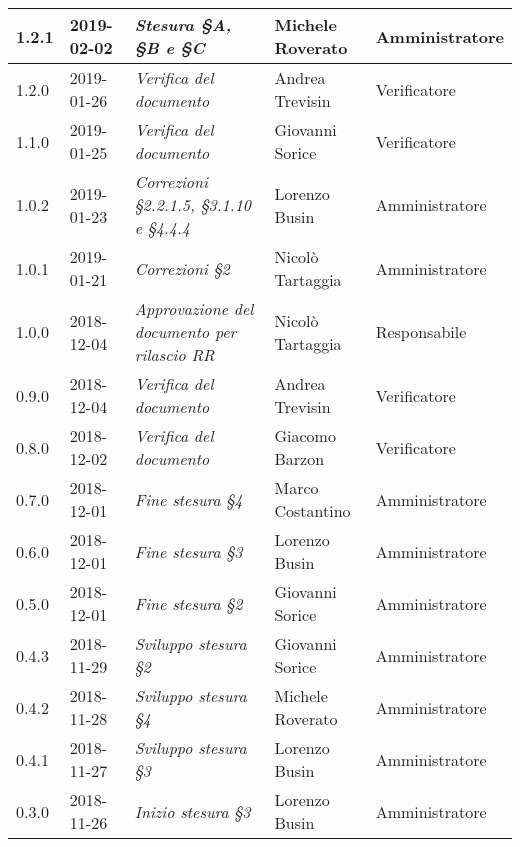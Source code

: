 \begin{longtable}{C{2cm}|C{2.5cm}|C{4.5cm}|C{2.5cm}|C{3cm}}
		1.2.1 & 2019-02-02 & \emph{Stesura §A, §B e §C} & Michele Roverato & Amministratore  \\
		\hline
		
		1.2.0 & 2019-01-26 & \emph{Verifica del documento} & Andrea Trevisin & Verificatore  \\
		\hline
		
		1.1.0 & 2019-01-25 & \emph{Verifica del documento} & Giovanni Sorice & Verificatore  \\
		\hline
		
		1.0.2 & 2019-01-23 & \emph{Correzioni §2.2.1.5, §3.1.10 e §4.4.4} & Lorenzo Busin & Amministratore \\
		\hline
		
		1.0.1 & 2019-01-21 & \emph{Correzioni §2} & Nicolò Tartaggia & Amministratore  \\
		\hline
		
		1.0.0  & 2018-12-04 & \emph{Approvazione del documento per rilascio RR} & Nicolò Tartaggia & Responsabile \\
		\hline
		
		0.9.0 & 2018-12-04 &\emph{Verifica del documento} & Andrea Trevisin & Verificatore \\
		\hline
		
	    0.8.0 & 2018-12-02 & \emph{Verifica del documento} & Giacomo Barzon & Verificatore  \\
		\hline
		
		0.7.0 & 2018-12-01 & \emph{Fine stesura §4} & Marco Costantino & Amministratore  \\
		\hline
		
		0.6.0 & 2018-12-01 & \emph{Fine stesura §3} & Lorenzo Busin & Amministratore  \\
		\hline
		
	 	0.5.0 & 2018-12-01 & \emph{Fine stesura §2} & Giovanni Sorice & Amministratore  \\
		\hline
		
		0.4.3 & 2018-11-29 & \emph{Sviluppo stesura §2} & Giovanni Sorice & Amministratore  \\
		\hline
		
		0.4.2 & 2018-11-28 & \emph{Sviluppo stesura §4} & Michele Roverato & Amministratore  \\
		\hline
		
		 0.4.1 & 2018-11-27 &\emph{Sviluppo stesura §3} & Lorenzo Busin & Amministratore \\
		\hline
		
		0.3.0 & 2018-11-26 & \emph{Inizio stesura §3} & Lorenzo Busin & Amministratore  \\
		\hline
		

\end{longtable}
